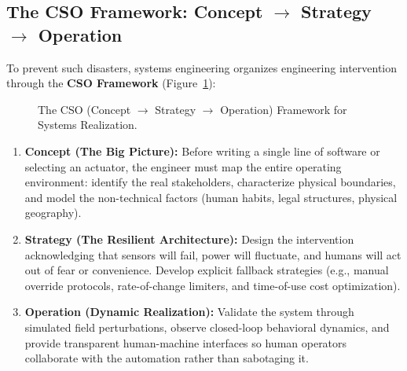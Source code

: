 \subsection{The CSO Framework: Concept \texorpdfstring{$\to$}{-->} Strategy \texorpdfstring{$\to$}{-->} Operation}
To prevent such disasters, systems engineering organizes engineering intervention through the \textbf{CSO Framework} (Figure~\ref{fig:cso_framework}):

\begin{figure}[htbp]
\centering
{}
\caption{The CSO (Concept $\to$ Strategy $\to$ Operation) Framework for Systems Realization.}
\label{fig:cso_framework}
\end{figure}

\begin{enumerate}[leftmargin=2em]
    \item \textbf{Concept (The Big Picture):} Before writing a single line of software or selecting an actuator, the engineer must map the entire operating environment: identify the real stakeholders, characterize physical boundaries, and model the non-technical factors (human habits, legal structures, physical geography).
    \item \textbf{Strategy (The Resilient Architecture):} Design the intervention acknowledging that sensors will fail, power will fluctuate, and humans will act out of fear or convenience. Develop explicit fallback strategies (e.g., manual override protocols, rate-of-change limiters, and time-of-use cost optimization).
    \item \textbf{Operation (Dynamic Realization):} Validate the system through simulated field perturbations, observe closed-loop behavioral dynamics, and provide transparent human-machine interfaces so human operators collaborate with the automation rather than sabotaging it.
\end{enumerate}

